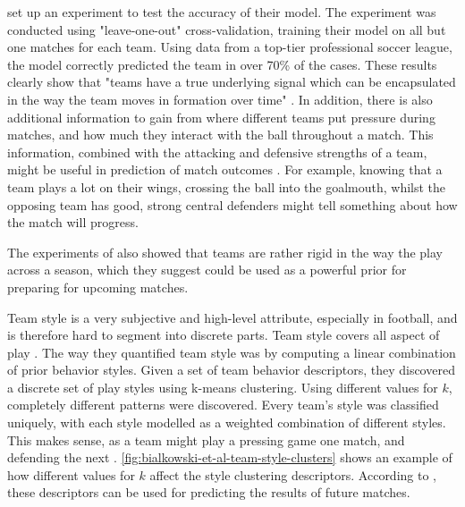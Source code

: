 \citet{bib:bialkowski-lucey-carr-yue-sridharan-matthews-2014} set up an experiment to test the accuracy of their model. The experiment was conducted using "leave-one-out" cross-validation, training their model on all but one matches for each team. Using data from a top-tier professional soccer league, the model correctly predicted the team in over 70\% of the cases. These results clearly show that "teams have a true underlying signal which can be encapsulated in the way the team moves in formation over time" \citep{bib:bialkowski-lucey-carr-yue-sridharan-matthews-2014}. In addition, there is also additional information to gain from where different teams put pressure during matches, and how much they interact with the ball throughout a match. This information, combined with the attacking and defensive strengths of a team, might be useful in prediction of match outcomes \citep{bib:bialkowski-lucey-carr-yue-matthews-2014}. For example, knowing that a team plays a lot on their wings, crossing the ball into the goalmouth, whilst the opposing team has good, strong central defenders might tell something about how the match will progress.

The experiments of \citet{bib:bialkowski-lucey-carr-yue-sridharan-matthews-2014} also showed that teams are rather rigid in the way the play across a season, which they suggest could be used as a powerful prior for preparing for upcoming matches.

Team style is a very subjective and high-level attribute, especially in football, and is therefore hard to segment into discrete parts. Team style covers all aspect of play \citep{bib:bialkowski-lucey-carr-yue-sridharan-matthews-2014}. The way they quantified team style was by computing a linear combination of prior behavior styles. Given a set of team behavior descriptors, they discovered a discrete set of play styles using k-means clustering. Using different values for $k$, completely different patterns were discovered. Every team's style was classified uniquely, with each style modelled as a weighted combination of different styles. This makes sense, as a team might play a pressing game one match, and defending the next \citep{bib:bialkowski-lucey-carr-yue-sridharan-matthews-2014}. \cref{fig:bialkowski-et-al-team-style-clusters} shows an example of how different values for $k$ affect the style clustering descriptors. According to \citet{bib:bialkowski-lucey-carr-yue-sridharan-matthews-2014}, these descriptors can be used for predicting the results of future matches.

